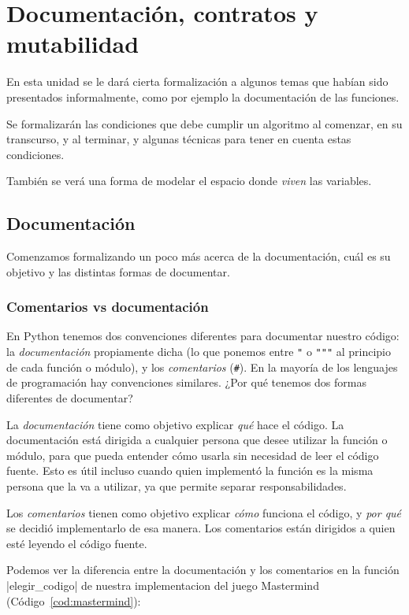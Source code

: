 \chapter{Documentación, contratos y mutabilidad}

En esta unidad se le dará cierta formalización a algunos temas que habían sido
presentados informalmente, como por ejemplo la documentación de las funciones.

Se formalizarán las condiciones que debe cumplir un algoritmo al comenzar, en
su transcurso, y al terminar, y algunas técnicas para tener en cuenta estas
condiciones.

También se verá una forma de modelar el espacio donde \textit{viven} las
variables.

\section{Documentación}

Comenzamos formalizando un poco más acerca de la documentación, cuál es su
objetivo y las distintas formas de documentar.

\subsection{Comentarios vs documentación}

En Python tenemos dos convenciones diferentes para documentar nuestro código:
la \emph{documentación} propiamente dicha (lo que ponemos entre \verb|"| o
\verb|"""| al principio de cada función o módulo), y los \emph{comentarios}
(\verb|#|).  En la mayoría de los lenguajes de programación hay convenciones
similares. ¿Por qué tenemos dos formas diferentes de documentar?

La \emph{documentación} tiene como objetivo explicar \emph{qué} hace el código.
La documentación está dirigida a cualquier persona que desee utilizar la
función o módulo, para que pueda entender cómo usarla sin necesidad de leer el
código fuente.  Esto es útil incluso cuando quien implementó la función es la
misma persona que la va a utilizar, ya que permite separar responsabilidades.

Los \emph{comentarios} tienen como objetivo explicar \emph{cómo} funciona el
código, y \emph{por qué} se decidió implementarlo de esa manera. Los comentarios
están dirigidos a quien esté leyendo el código fuente.

Podemos ver la diferencia entre la documentación y los comentarios en la
función |elegir_codigo| de nuestra implementacion del juego Mastermind
(Código~\ref{cod:mastermind}):

